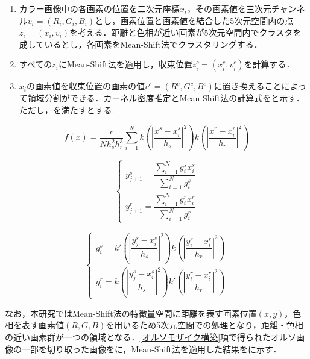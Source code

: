       \begin{enumerate}
        \setlength{\itemsep}{-5pt}
        \item カラー画像中の各画素の位置を二次元座標$x_i$，その画素値を三次元チャンネル$v_{i} =(R_{i},G_{i},B_{i})$とし，画素位置と画素値を結合した5次元空間内の点$z_{i} = (x_{i}, v_{i})$を考える．距離と色相が近い画素が5次元空間内でクラスタを成しているとし，各画素をMean-Shift法でクラスタリングする．
        \item すべての$z_{i}$にMean-Shift法を適用し，収束位置$z_{i}^c = (x_{i}^c , v_{i}^c)$を計算する．
        \item $x_{i}$の画素値を収束位置の画素の値$v^c = (R^c, G^c, B^c)$に置き換えることによって領域分割ができる．カーネル密度推定とMean-Shift法の計算式をと示す．ただし，を満たすとする.
      \end{enumerate}
    
      \begin{equation}
        \label{Mean-Shift法1}
        f(x) = \dfrac{c} {N h_{s}^2 h_{r}^3}
          \sum_{i=1}^{N}
          k (|\dfrac{x^s - x_{i}^s} {h_{s}}|^2) k (|\dfrac{x^r - x_{i}^r} {h_{r}}|^2)
      \end{equation}

      \begin{equation}
        \label{Mean-Shift法2}
        \left\{
          \begin{array}{l}
            y_{j+1}^s = 
              \dfrac{\sum_{i=1}^{N} g_{i}^s x_{i}^s} {\sum_{i=1}^{N} g_{i}^s} \\ 
            y_{j+1}^r = 
              \dfrac{\sum_{i=1}^{N} g_{i}^r x_{i}^r} {\sum_{i=1}^{N} g_{i}^r}
          \end{array}
        \right.
      \end{equation}

      \begin{equation}
        \label{Mean-Shift法3}
        \left\{
          \begin{array}{l}
            g_{i}^s = k' (|\dfrac{y_{j}^s - x_{i}^s} {h_{s}}|^2)
              k  (|\dfrac{y_{i}^r - x_{i}^r} {h_{r}}|^2) \\
            g_{i}^r = k  (|\dfrac{y_{j}^s - x_{i}^s} {h_{s}}|^2) 
              k' (|\dfrac{y_{i}^r - x_{i}^r} {h_{r}}|^2)
          \end{array}
        \right.
      \end{equation}

      なお，本研究ではMean-Shift法の特徴量空間に距離を表す画素位置$(x,y)$，色相を表す画素値$(R,G,B)$を用いるため5次元空間での処理となり，距離・色相の近い画素群が一つの領域となる．\ref{オルソモザイク構築}項で得られたオルソ画像の一部を切り取った画像をに，Mean-Shift法を適用した結果をに示す．

